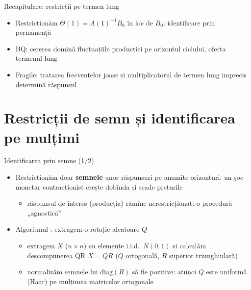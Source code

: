 \begin{frame}{Recapitulare: restricții pe termen lung}
\itemsize{\small}
\begin{itemize}
    \item Restricționăm $\Theta(1) = A(1)^{-1}B_0$ în loc de $B_0$: identificare prin permanență
    \item BQ: cererea domină fluctuațiile producției pe orizontul ciclului, oferta termenul lung
    \item Fragile: tratarea frecvențelor joase și multiplicatorul de termen lung imprecis determină răspunsul
\end{itemize}
\end{frame}


\section{Restricții de semn și identificarea pe mulțimi}

\begin{frame}{Identificarea prin semne (1/2)}
\itemsize{\small}
\begin{itemize}
    \item Restricționăm doar \textbf{semnele} unor răspunsuri pe anumite orizonturi: un șoc monetar contracționist crește dobînda și scade prețurile 
    \begin{itemize}
        \item răspunsul de interes (producția) rămîne nerestricționat: o procedură „agnostică”
    \end{itemize}
    \item Algoritmul : extragem o rotație aleatoare $Q$
    \begin{itemize}
        \item extragem $X$ ($n \times n$) cu elemente i.i.d.\ $N(0, 1)$ și calculăm descompunerea QR $X = QR$ ($Q$ ortogonală, $R$ superior triunghiulară)
        \item normalizăm semnele lui $\mathrm{diag}(R)$ să fie pozitive: atunci $Q$ este uniformă (Haar) pe mulțimea matricelor ortogonale
    \end{itemize}
\end{itemize}
\end{frame}

